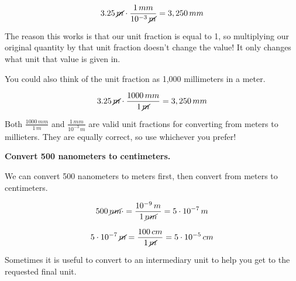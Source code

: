 \documentclass[12pt]{book}
\begin{document}
\begin{equation}
3.25 \, \cancel{m} \cdot \frac{1 \, mm}{10^{-3} \, \cancel{m}} = 3,250 \, mm
\end{equation}


The reason this works is that our unit fraction is equal to 1, so multiplying our original quantity by that unit fraction doesn't change the value! It only changes what unit that value is given in.

You could also think of the unit fraction as 1,000 millimeters in a meter.

\begin{equation}
3.25 \, \cancel{m} \cdot \frac{1000 \, mm}{1 \, \cancel{m}} = 3,250 \, mm
\end{equation}

Both $\frac{1000 \, mm}{1 \, m}$ and $\frac{1 \, mm}{10^{-3} \, m}$ are valid unit fractions for converting from meters to millieters. They are equally correct, so use whichever you prefer!

\begin{exampleblock}

\textbf{Convert 500 nanometers to centimeters.}

\hspace{10pt}

We can convert 500 nanometers to meters first, then convert from meters to centimeters.

\begin{equation}
500 \, \cancel{nm} \cdot = \frac{10^{-9} \, m}{1 \, \cancel{nm}} = 5 \cdot 10^{-7} \, m
\end{equation}

\begin{equation}
5 \cdot 10^{-7} \, \cancel{m} = \frac{100 \, cm}{1 \, \cancel{m}} = 5 \cdot 10^{-5} \, cm 
\end{equation}

Sometimes it is useful to convert to an intermediary unit to help you get to the requested final unit.
\end{exampleblock}


\end{document}
